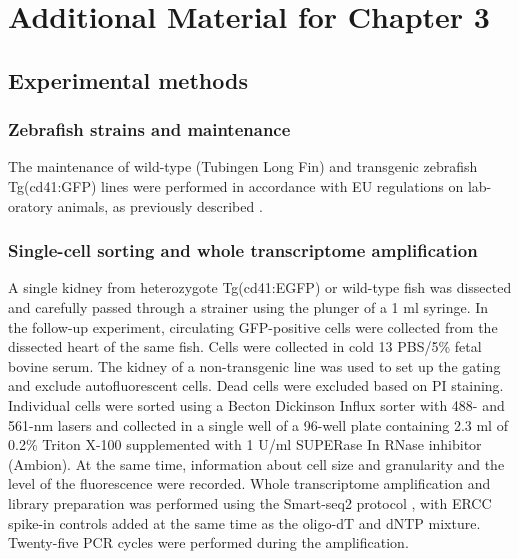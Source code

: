 
\chapter{Additional Material for Chapter 3}

\graphicspath{{Appendix2/Figs/}}

\section{Experimental methods} \label{sec:zebrafish-methods}

\subsection{Zebrafish strains and maintenance}

The maintenance of wild-type (Tubingen Long Fin) and transgenic zebrafish Tg(cd41:GFP) lines were performed in accordance with EU regulations on lab- oratory animals, as previously described \cite{Bielczyk-Maczynska2014-hf}.

\subsection{Single-cell sorting and whole transcriptome amplification}

A single kidney from heterozygote Tg(cd41:EGFP) or wild-type fish was dissected and carefully passed through a strainer using the plunger of a 1 ml syringe. In the follow-up experiment, circulating GFP-positive cells were collected from the dissected heart of the same fish. Cells were collected in cold 13 PBS/5\% fetal bovine serum. The kidney of a non-transgenic line was used to set up the gating and exclude autofluorescent cells. Dead cells were excluded based on PI staining. Individual cells were sorted using a Becton Dickinson Influx sorter with 488- and 561-nm lasers \cite{Schulte2015-dh} and collected in a single well of a 96-well plate containing 2.3 ml of 0.2\% Triton X-100 supplemented with 1 U/ml SUPERase In RNase inhibitor (Ambion). At the same time, information about cell size and granularity and the level of the fluorescence were recorded. Whole transcriptome amplification and library preparation was performed using the Smart-seq2 protocol  \cite{Picelli2013-px, Picelli2014-hr}, with ERCC spike-in controls added at the same time as the oligo-dT and dNTP mixture. Twenty-five PCR cycles were performed during the amplification.


